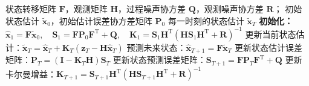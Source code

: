 \begin{algorithm}[htb!]
    \caption{卡尔曼滤波递推算法}
    \label{alg:kalman}
    \begin{algorithmic}[1]
        \Require
        状态转移矩阵 $\mathbf{F}$，观测矩阵 $\mathbf{H}$，过程噪声协方差 $\mathbf{Q}$，观测噪声协方差 $\mathbf{R}$；
        初始状态估计 $\tilde{\bm{x}}_{0}$，初始估计误差协方差矩阵 $\mathbf{P}_{0}$
        \Ensure
        每一时刻的状态估计 $\tilde{\bm{x}}_{T}$
        \State \textbf{初始化：} \(\hat{\bm{x}}_{1} = \mathbf{F} \tilde{\bm{x}}_{0}, \quad \mathbf{S}_{1} = \mathbf{F} \mathbf{P}_0 \mathbf{F}^{\mathrm{T}} + \mathbf{Q}, \quad \mathbf{K}_{1} = \mathbf{S}_{1} \mathbf{H}^{\mathrm{T}} \left( \mathbf{H} \mathbf{S}_{1} \mathbf{H}^{\mathrm{T}} + \mathbf{R} \right)^{-1}\)
        \State 更新当前状态估计：\( \tilde{\bm{x}}_T = \hat{\bm{x}}_T + \mathbf{K}_T \left( \bm{z}_T - \mathbf{H} \hat{\bm{x}}_{T} \right) \)
        \State 预测未来状态：\( \hat{\bm{x}}_{T+1} = \mathbf{F} \tilde{\bm{x}}_T \)
        \State 更新状态估计误差矩阵：\( \mathbf{P}_T = (\mathbf{I} - \mathbf{K}_T \mathbf{H}) \mathbf{S}_T \)
        \State 更新状态预测误差矩阵：\( \mathbf{S}_{T+1} = \mathbf{F} \mathbf{P}_T \mathbf{F}^{\mathrm{T}} + \mathbf{Q} \)
        \State 更新卡尔曼增益：\( \mathbf{K}_{T+1} = \mathbf{S}_{T+1} \mathbf{H}^{\mathrm{T}} \left( \mathbf{H} \mathbf{S}_{T+1} \mathbf{H}^{\mathrm{T}} + \mathbf{R} \right)^{-1} \)
        \EndFor
    \end{algorithmic}
\end{algorithm}

